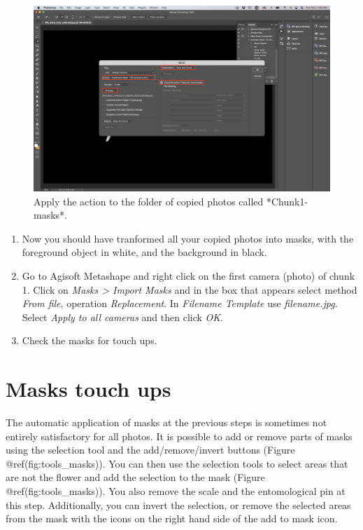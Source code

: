 \documentclass[
]{book}
\begin{document}
\begin{figure}

{\centering \includegraphics[width=1\linewidth]{Figures/mask_4} 

}

\caption{Apply the action to the folder of copied photos called *Chunk1-masks*.}\label{fig:mask4}
\end{figure}

\begin{enumerate}
\def\labelenumi{\arabic{enumi}.}
\setcounter{enumi}{4}
\item
  Now you should have tranformed all your copied photos into masks,
  with the foreground object in white, and the background in black.
\item
  Go to Agisoft Metashape and right click on the first camera (photo)
  of chunk 1. Click on \emph{Masks \textgreater{} Import Masks} and in the box that
  appears select method \emph{From file}, operation \emph{Replacement}. In
  \emph{Filename Template} use \emph{filename.jpg}. Select \emph{Apply to all
  cameras} and then click \emph{OK}.
\item
  Check the masks for touch ups.
\end{enumerate}

\hypertarget{masks-touch-ups}{%
\section{Masks touch ups}\label{masks-touch-ups}}

The automatic application of masks at the previous steps is sometimes
not entirely satisfactory for all photos. It is possible to add or
remove parts of masks using the selection tool and the add/remove/invert
buttons (Figure @ref(fig:tools\_masks)). You can then use the selection tools to
select areas that are not the flower and add the selection to the mask
(Figure @ref(fig:tools\_masks)). You also remove the scale and the
entomological pin at this step. Additionally, you can invert the
selection, or remove the selected areas from the mask with the icons on
the right hand side of the add to mask icon.
\end{document}
